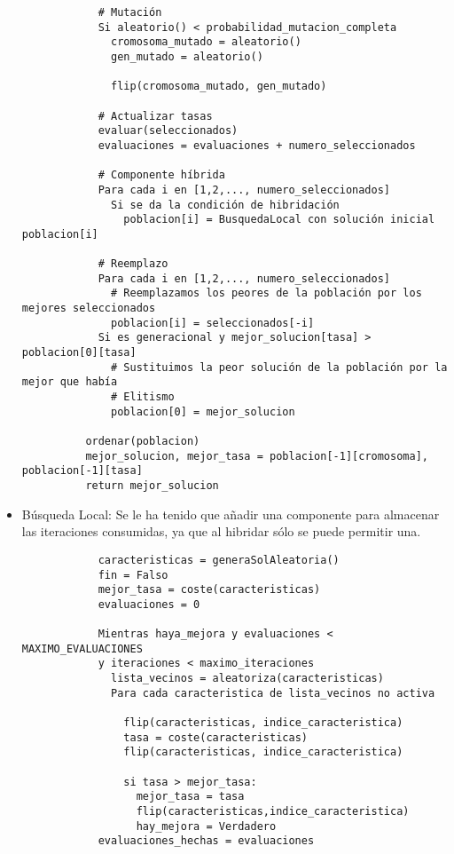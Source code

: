 \documentclass[a4paper, 11pt]{article}
\begin{document}
\begin{itemize}
\begin{verbatim}
            # Mutación
            Si aleatorio() < probabilidad_mutacion_completa
              cromosoma_mutado = aleatorio()
              gen_mutado = aleatorio()

              flip(cromosoma_mutado, gen_mutado)

            # Actualizar tasas
            evaluar(seleccionados)
            evaluaciones = evaluaciones + numero_seleccionados

            # Componente híbrida
            Para cada i en [1,2,..., numero_seleccionados]
              Si se da la condición de hibridación
                poblacion[i] = BusquedaLocal con solución inicial poblacion[i]

            # Reemplazo
            Para cada i en [1,2,..., numero_seleccionados]
              # Reemplazamos los peores de la población por los mejores seleccionados
              poblacion[i] = seleccionados[-i]
            Si es generacional y mejor_solucion[tasa] > poblacion[0][tasa]
              # Sustituimos la peor solución de la población por la mejor que había
              # Elitismo
              poblacion[0] = mejor_solucion

          ordenar(poblacion)
          mejor_solucion, mejor_tasa = poblacion[-1][cromosoma], poblacion[-1][tasa]
          return mejor_solucion
        \end{verbatim}
        \item Búsqueda Local: Se le ha tenido que añadir una componente
        para almacenar las iteraciones consumidas, ya que al hibridar sólo se
        puede permitir una.
          \begin{verbatim}
            caracteristicas = generaSolAleatoria()
            fin = Falso
            mejor_tasa = coste(caracteristicas)
            evaluaciones = 0

            Mientras haya_mejora y evaluaciones < MAXIMO_EVALUACIONES
            y iteraciones < maximo_iteraciones
              lista_vecinos = aleatoriza(caracteristicas)
              Para cada caracteristica de lista_vecinos no activa

                flip(caracteristicas, indice_caracteristica)
                tasa = coste(caracteristicas)
                flip(caracteristicas, indice_caracteristica)

                si tasa > mejor_tasa:
                  mejor_tasa = tasa
                  flip(caracteristicas,indice_caracteristica)
                  hay_mejora = Verdadero
            evaluaciones_hechas = evaluaciones
              \end{verbatim}
    \end{itemize}
\end{document}
